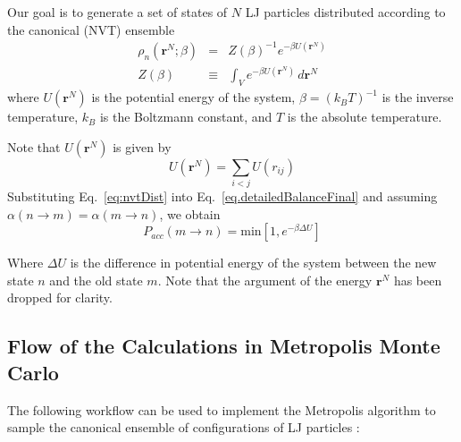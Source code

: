 \documentclass[aip,jcp,preprint,superscriptaddress,floatfix]{revtex4-1}
\begin{document}
Our goal is to generate a set of states of $N$ LJ particles distributed according to the canonical (NVT) ensemble
\begin{eqnarray}
	\rho_n \left(\textbf{r}^N ; \beta \right) &=& Z(\beta)^{-1} e^{-\beta U \left( \textbf{r}^N \right)} \label{eq:nvtDist} \\
	Z(\beta) &\equiv& \int_V e^{-\beta U \left(  \textbf{r}^N \right)} \, d\textbf{r}^N 
\end{eqnarray}
where $U \left( \textbf{r}^N \right)$ is the potential energy of the system, $\beta = (k_B T)^{-1}$ is the inverse temperature, $k_B$ is the Boltzmann constant, and $T$ is the absolute temperature. 

Note that  $U \left( \textbf{r}^N \right)$ is given by
\begin{equation}
	U \left( \textbf{r}^N \right) = \sum_{i < j} U \left( r_{ij} \right)
\end{equation}
Substituting Eq.~\ref{eq:nvtDist} into Eq.~\ref{eq.detailedBalanceFinal} and assuming $\alpha \left( n \rightarrow m \right) =  \alpha \left( m \rightarrow n \right)$, we obtain
\begin{equation}
	P_{acc}(m \rightarrow n) = \text{min} \left[
		1,e^{-\beta \Delta U}
	\right]
	\label{eq.detailedBalanceNVT}
\end{equation}

Where $\Delta U$ is the difference in potential energy of the system
between the new state $n$ and the old state $m$. Note that the argument
of the energy $\textbf{r}^N$ has been dropped for clarity.

\subsection{Flow of the Calculations in Metropolis Monte Carlo}

The following workflow can be used to implement the Metropolis algorithm to sample the canonical ensemble of configurations of LJ particles \cite{Shell.Notes, Maginn.Notes}:
\end{document}
